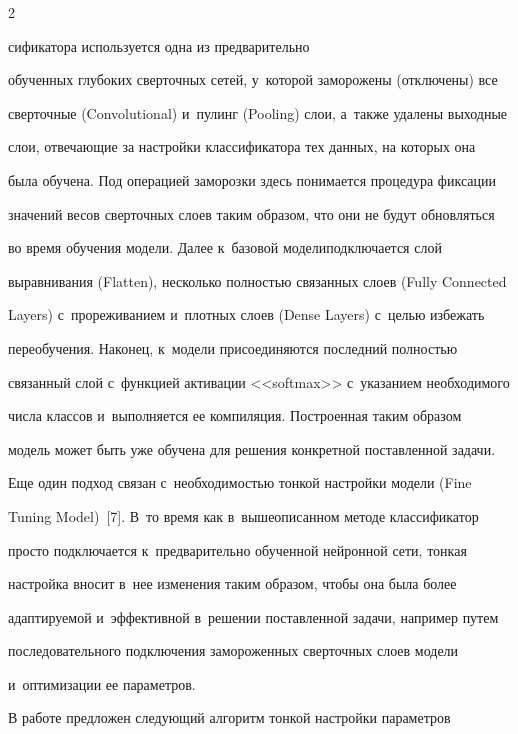 \begin{multicols}{2}
\pagebreak



\noindent

сификатора используется одна из предварительно 

обученных глубоких сверточных сетей, у~которой заморожены (отключены) все 

сверточные (Convolutional) и~пулинг (Pooling) слои, а~также удалены выходные 

слои, отвечающие за настройки классификатора тех данных, на которых она 

была обучена. Под операцией заморозки здесь понимается процедура фиксации 

значений весов сверточных слоев таким образом, что они не будут обновляться 

во время обучения модели. Далее к~базовой модели\linebreak подключается слой 

выравнивания (Flatten), не\-сколь\-ко полностью связанных слоев (Fully Connected 

Layers) с~прореживанием и~плотных слоев (Dense Layers) с~целью избежать 

переобучения. Наконец, к~модели присоединяются последний полностью 

связанный слой с~функцией активации <<softmax>> с~указанием необходимого 

числа классов и~выполняется ее компиляция. Построенная таким образом 

модель может быть уже обучена для решения конкретной поставленной задачи.

  

  Еще один подход связан с~необходимостью тонкой настройки модели (Fine 

Tuning Model)~[7]. В~то время как в~вышеописанном методе классификатор 

просто подключается к~предварительно обученной нейронной сети, тонкая 

настройка вносит в~нее изменения таким образом, чтобы она была более 

адап\-ти\-ру\-емой и~эффективной в~решении по\-став\-лен\-ной задачи, например путем 

последовательного подключения замороженных сверточных слоев модели 

и~оптимизации ее па\-ра\-мет\-ров. 

  

  В работе предложен сле\-ду\-ющий алгоритм тонкой настройки па\-ра\-мет\-ров 


\end{multicols}
